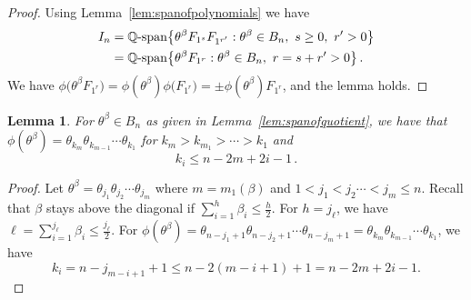 \documentclass[11pt]{amsart}
\newtheorem{lemma}[theorem]{Lemma}
\theoremstyle{definition}
\numberwithin{equation}{section}
\begin{document}
\begin{proof} Using Lemma~\ref{lem:spanofpolynomials} we have
\begin{align*}
 I_n &=  {\mathbb Q}\text{\rm -span}\big\{  \theta^\beta F_{1^s} F_{1^{r'}} :  \theta^\beta \in B_n,\  s\ge 0,\  r'>0\big\}\\
       &=  {\mathbb Q}\text{\rm -span}\big\{  \theta^\beta F_{1^{r}} :  \theta^\beta \in B_n,\  r=s+r'>0\big\}\,.
 \end{align*}
We have $\phi\big(\theta^\beta F_{1^r}\big)=\phi(\theta^\beta) \phi\big(F_{1^r}\big) = \pm \phi(\theta^\beta) F_{1^r}$, and the lemma holds.
\end{proof}

\begin{lemma}\label{lem:phiB}
For $\theta^\beta\in B_n$ as given in Lemma~\ref{lem:spanofquotient}, we have that $\phi(\theta^\beta)=\theta_{k_m} \theta_{k_{m-1}}\cdots \theta_{k_1}$
for $k_m>k_{m_1}>\cdots >k_1$ and
\begin{equation}\label{eq:phiB}
k_i  \le  n-2m+2i-1\,.
\end{equation}
\end{lemma}

\begin{proof} Let $\theta^\beta=\theta_{j_1} \theta_{j_2}\cdots \theta_{j_m}$ where $m=m_1(\beta)$ and
$1<j_1< j_2\cdots <j_m\le n$. Recall that $\beta$ stays above the diagonal
if $\sum_{i=1}^h \beta_i\le \frac{h}{2}$.  For $h=j_\ell$, we have
 $\ell=\sum_{i=1}^{j_\ell} \beta_i \le \frac{j_\ell}{2}$.
For $\phi(\theta^\beta)=\theta_{n-j_1+1} \theta_{n-j_2+1}\cdots \theta_{n-j_m+1}=\theta_{k_m} \theta_{k_{m-1}}\cdots \theta_{k_1}$, we have
 $$  k_i = n-j_{m-i+1}+1 \le n-2(m-i+1)+1 = n-2m+2i-1.
 $$
\vskip-18pt \end{proof}


\end{document}
